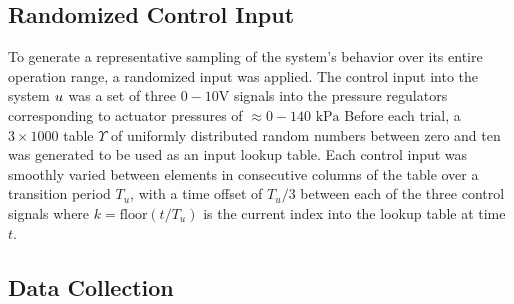 \subsection{Randomized Control Input}

To generate a representative sampling of the system's behavior over its entire operation range, a randomized input was applied.
The control input into the system $u$ was a set of three $0-10 \text{V}$ signals into the pressure regulators corresponding to actuator pressures of $\approx 0-140 \text{ kPa}$
Before each trial, a $3 \times 1000$ table $\Upsilon$ of uniformly distributed random numbers between zero and ten was generated to be used as an input lookup table.
Each control input was smoothly varied between elements in consecutive columns of the table over a transition period $T_u$, with a time offset of $T_u / 3$ between each of the three control signals
where $k = \text{floor}\left( {t} / {T_u} \right)$ is the current index into the lookup table at time $t$. 



\subsection{Data Collection}



